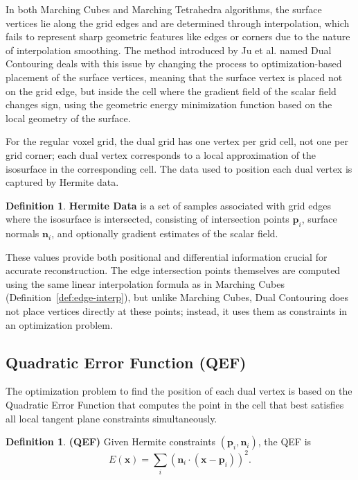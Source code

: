 \documentclass[12pt, a4paper, oneside]{book}
\theoremstyle{plain}
\theoremstyle{definition}
\newtheorem{definition}[theorem]{Definition}
\theoremstyle{remark}
\theoremstyle{definition}
\begin{document}
In both Marching Cubes and Marching Tetrahedra algorithms, the surface vertices lie along the grid edges and are determined through interpolation, which fails to represent sharp geometric features like edges or corners due to the nature of interpolation smoothing. The method introduced by Ju et al. \cite{ju2002dual} named Dual Contouring deals with this issue by changing the process to optimization-based placement of the surface vertices, meaning that the surface vertex is placed not on the grid edge, but inside the cell where the gradient field of the scalar field changes sign, using the geometric energy minimization function based on the local geometry of the surface.

For the regular voxel grid, the dual grid has one vertex per grid cell, not one per grid corner; each dual vertex corresponds to a local approximation of the isosurface in the corresponding cell. The data used to position each dual vertex is captured by Hermite data.

\begin{definition}
    \textbf{Hermite Data} is a set of samples associated with grid edges where the isosurface is intersected, consisting of intersection points $\mathbf{p}_i$, surface normals $\mathbf{n}_i$, and optionally gradient estimates of the scalar field.
\end{definition}

These values provide both positional and differential information crucial for accurate reconstruction. The edge intersection points themselves are computed using the same linear interpolation formula as in Marching Cubes (Definition~\ref{def:edge-interp}), but unlike Marching Cubes, Dual Contouring does not place vertices directly at these points; instead, it uses them as constraints in an optimization problem.

\subsection{Quadratic Error Function (QEF)}

The optimization problem to find the position of each dual vertex is based on the Quadratic Error Function that computes the point in the cell that best satisfies all local tangent plane constraints simultaneously.

\begin{definition}
\textbf{(QEF)}
Given Hermite constraints $(\mathbf{p}_i, \mathbf{n}_i)$, the QEF is
\[
E(\mathbf{x}) = \sum_i \left( \mathbf{n}_i \cdot (\mathbf{x} - \mathbf{p}_i) \right)^2.
\]
\end{definition}
\end{document}
